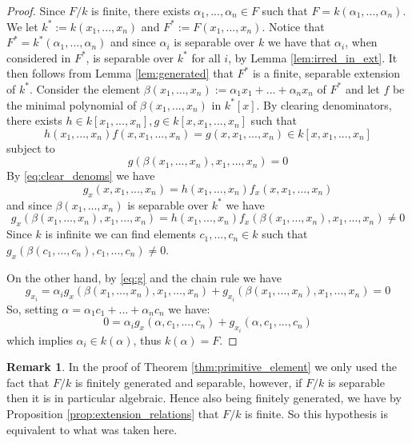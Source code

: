 \documentclass[12pt]{article}
\theoremstyle{plain}
\theoremstyle{definition}
\newtheorem{remark}[thm]{Remark}
\begin{document}
\begin{proof}
Since $F/k$ is finite, there exists $\alpha_1,...,\alpha_n \in F$ such that $F = k(\alpha_1,...,\alpha_n)$. We let $k^\ast := k(x_1,...,x_n)$ and $F^\ast := F(x_1,...,x_n)$. Notice that $F^\ast = k^\ast(\alpha_1,...,\alpha_n)$ and since $\alpha_i$ is separable over $k$ we have that $\alpha_i$, when considered in $F^\ast$, is separable over $k^\ast$ for all $i$, by Lemma \ref{lem:irred_in_ext}. It then follows from Lemma \ref{lem:generated} that $F^\ast$ is a finite, separable extension of $k^\ast$. Consider the element $\beta(x_1,...,x_n) := \alpha_1x_1 + ... + \alpha_nx_n$ of $F^\ast$ and let $f$ be the minimal polynomial of $\beta(x_1,...,x_n)$ in $k^\ast[x]$. By clearing denominators, there exists $h \in k[x_1,...,x_n], g\in k[x,x_1,...,x_n]$ such that 
\begin{equation}
\label{eq:clear_denoms}
h(x_1,...,x_n)f(x,x_1,...,x_n) = g(x,x_1,...,x_n) \in k[x,x_1,...,x_n]
\end{equation}
subject to 
\begin{equation}
\label{eq:g}
g(\beta(x_1,...,x_n),x_1,...,x_n) = 0
\end{equation}
By \eqref{eq:clear_denoms} we have 
\begin{equation}
g_x(x,x_1,...,x_n) = h(x_1,...,x_n)f_x(x,x_1,...,x_n)    
\end{equation}
and since $\beta(x_1,...,x_n)$ is separable over $k^\ast$ we have
\begin{equation}
    g_x(\beta(x_1,...,x_n),x_1,...,x_n) = h(x_1,...,x_n)f_x(\beta(x_1,...,x_n),x_1,...,x_n) \neq 0
\end{equation}
Since $k$ is infinite we can find elements $c_1,...,c_n \in k$ such that $g_x(\beta(c_1,...,c_n),c_1,...,c_n) \neq 0$.

On the other hand, by \eqref{eq:g} and the chain rule we have
\begin{equation}
\label{eq:partials}
    g_{x_i} = \alpha_i g_x(\beta(x_1,...,x_n),x_1,...,x_n) + g_{x_i}(\beta(x_1,...,x_n),x_1,...,x_n) = 0
\end{equation}
So, setting $\alpha = \alpha_1 c_1 + ... + \alpha_n c_n$ we have:
\begin{equation}
\label{eq:result}
0 = \alpha_ig_x(\alpha,c_1,...,c_n) + g_{x_i}(\alpha,c_1,...,c_n)
\end{equation}
which implies $\alpha_i \in k(\alpha)$, thus $k(\alpha) = F$.
\end{proof}
\begin{remark}
In the proof of Theorem \ref{thm:primitive_element} we only used the fact that $F/k$ is finitely generated and separable, however, if $F/k$ is separable then it is in particular algebraic. Hence also being finitely generated, we have by Proposition \ref{prop:extension_relations} that $F/k$ is finite. So this hypothesis is equivalent to what was taken here.
\end{remark}
%
\end{document}
